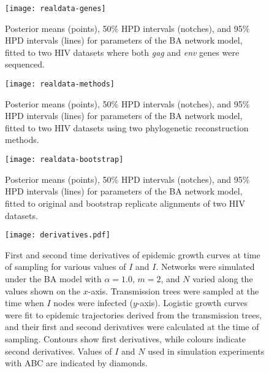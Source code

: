 \documentclass[12pt]{article}\usepackage[]{graphicx}\usepackage[]{color}
\begin{document}
\begin{figure}
    \centering
    \texttt{[image: realdata-genes]}
    \caption[
        Posterior means and 50\%/95\% HPD intervals for parameters of the
        BA network model, fitted to two HIV datasets where both \textit{gag}
        and \textit{env} genes were sequenced.
    ]{
        Posterior means (points), 50\% HPD intervals (notches), and 95\%
        HPD intervals (lines) for parameters of the BA network model, fitted to
        two HIV datasets where both \textit{gag} and \textit{env} genes were
        sequenced.
    }
    \label{fig:genes}
\end{figure}

\begin{figure}[ht]
    \centering
    \texttt{[image: realdata-methods]}
    \caption[
        Posterior means and 50\%/95\% HPD intervals for parameters of the
        BA network model, fitted to two HIV datasets using two phylogenetic
        reconstruction methods.
    ]{
        Posterior means (points), 50\% HPD intervals (notches), and 95\%
        HPD intervals (lines) for parameters of the BA network model, fitted to
        two HIV datasets using two phylogenetic reconstruction methods.
    }
    \label{fig:methods}
\end{figure}

\begin{figure}[ht]
    \centering
    \texttt{[image: realdata-bootstrap]}
    \caption[
        Posterior means and 50\%/95\% HPD intervals for parameters of the
        BA network model, fitted to original and bootstrap replicate alignments
        of two HIV datasets.
    ]{
        Posterior means (points), 50\% HPD intervals (notches), and 95\%
        HPD intervals (lines) for parameters of the BA network model, fitted to
        original and bootstrap replicate alignments of two HIV datasets.
    }
    \label{fig:boot}
\end{figure}

\begin{figure}[ht]
  \centering
  \texttt{[image: derivatives.pdf]}
  \caption[
    First and second time derivatives of epidemic growth curves at time of
    sampling for various values of $I$ and $N$.
  ]{
    First and second time derivatives of epidemic growth curves at time
    of sampling for various values of $I$ and $I$. Networks were simulated
    under the BA model with $\alpha = 1.0$, $m = 2$, and $N$ varied along the
    values shown on the $x$-axis. Transmission trees were sampled at the time
    when $I$ nodes were infected ($y$-axis). Logistic growth curves were fit to
    epidemic trajectories derived from the transmission trees, and their first
    and second derivatives were calculated at the time of sampling. Contours
    show first derivatives, while colours indicate second derivatives. Values
    of $I$ and $N$ used in simulation experiments with ABC are indicated by
    diamonds.
  }
  \label{fig:derivs}
\end{figure}
\end{document}
